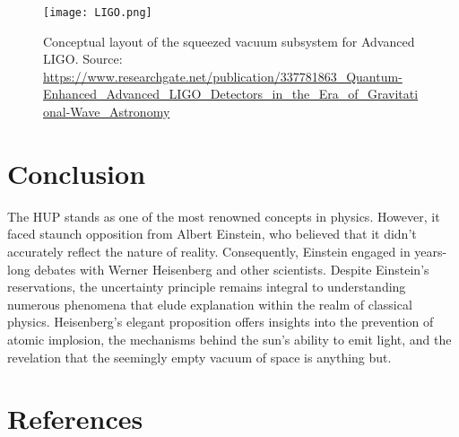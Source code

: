 \documentclass{article}
\begin{document}
\begin{figure}[h]
\centering
\texttt{[image: LIGO.png]}
\caption{\small Conceptual layout of the squeezed vacuum subsystem for Advanced LIGO. Source: \url{https://www.researchgate.net/publication/337781863_Quantum-Enhanced_Advanced_LIGO_Detectors_in_the_Era_of_Gravitational-Wave_Astronomy}}
\label{fig}
\end{figure}



\section{Conclusion}

The HUP stands as one of the most renowned concepts in physics. However, it faced staunch opposition from Albert Einstein, who believed that it didn't accurately reflect the nature of reality. Consequently, Einstein engaged in years-long debates with Werner Heisenberg and other scientists. Despite Einstein's reservations, the uncertainty principle remains integral to understanding numerous phenomena that elude explanation within the realm of classical physics. Heisenberg's elegant proposition offers insights into the prevention of atomic implosion, the mechanisms behind the sun's ability to emit light, and the revelation that the seemingly empty vacuum of space is anything but. 


\section{References}
\printbibliography[heading=none]
\end{document}
